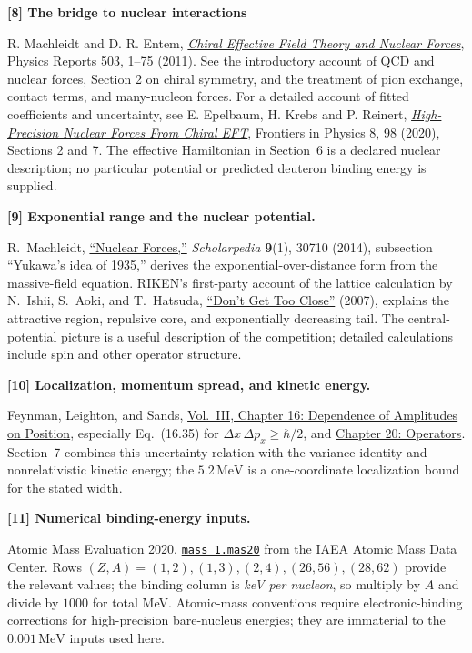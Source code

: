 \documentclass[11pt]{article}
\newcommand{\source}[3]{\par\medskip\hypertarget{src#1}{}\textbf{[#1] #2}\par\nopagebreak #3\par}
\begin{document}
\source{8}{The bridge to nuclear interactions}{R. Machleidt and D. R. Entem, \href{https://arxiv.org/abs/1105.2919}{\emph{Chiral Effective Field Theory and Nuclear Forces}}, Physics Reports 503, 1--75 (2011). See the introductory account of QCD and nuclear forces, Section 2 on chiral symmetry, and the treatment of pion exchange, contact terms, and many-nucleon forces. For a detailed account of fitted coefficients and uncertainty, see E. Epelbaum, H. Krebs and P. Reinert, \href{https://www.frontiersin.org/journals/physics/articles/10.3389/fphy.2020.00098/full}{\emph{High-Precision Nuclear Forces From Chiral EFT}}, Frontiers in Physics 8, 98 (2020), Sections 2 and 7. The effective Hamiltonian in Section~6 is a declared nuclear description; no particular potential or predicted deuteron binding energy is supplied.}

\source{9}{Exponential range and the nuclear potential.}{R.~Machleidt,
\href{https://www.scholarpedia.org/article/Nuclear_Forces}{``Nuclear Forces,''}
\emph{Scholarpedia} \textbf{9}(1), 30710 (2014), subsection ``Yukawa's idea
of 1935,'' derives the exponential-over-distance form from the massive-field
equation. RIKEN's first-party account of the lattice calculation
by N.~Ishii, S.~Aoki, and T.~Hatsuda,
\href{https://www.riken.jp/en/news_pubs/research_news/rr/5066/}{
``Don't Get Too Close''} (2007), explains the attractive region, repulsive
core, and exponentially decreasing tail. The central-potential picture is
a useful description of the competition; detailed calculations include
spin and other operator structure.}

\source{10}{Localization, momentum spread, and kinetic energy.}{Feynman,
Leighton, and Sands,
\href{https://www.feynmanlectures.caltech.edu/III_16.html}{Vol.~III,
Chapter 16: Dependence of Amplitudes on Position}, especially Eq.~(16.35)
for $\Delta x\,\Delta p_x\geq\hbar/2$, and
\href{https://www.feynmanlectures.caltech.edu/III_20.html}{Chapter 20:
Operators}. Section~7 combines this uncertainty relation with the variance
identity and nonrelativistic kinetic energy; the $5.2\,\mathrm{MeV}$ is a
one-coordinate localization bound for the stated width.}

\source{11}{Numerical binding-energy inputs.}{Atomic Mass Evaluation 2020,
\href{https://www-nds.iaea.org/amdc/ame2020/mass_1.mas20.txt}{\texttt{mass\_1.mas20}}
from the IAEA Atomic Mass Data Center. Rows $(Z,A)=(1,2),(1,3),(2,4),(26,56),
(28,62)$ provide the relevant values; the binding column is \emph{keV per
nucleon}, so multiply by $A$ and divide by $1000$ for total MeV. Atomic-mass
conventions require electronic-binding corrections for high-precision bare-nucleus
energies; they are immaterial to the $0.001\,\mathrm{MeV}$ inputs used here.}
\end{document}
